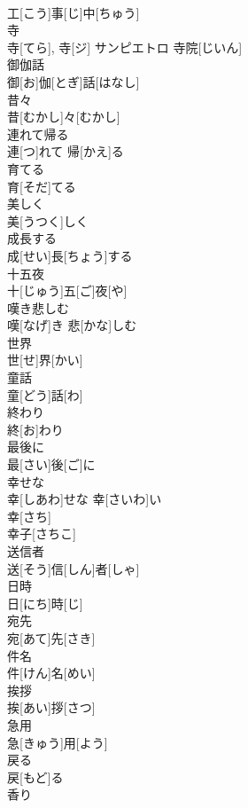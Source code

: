 \documentclass[8pt]{extreport}
\begin{document}
\begin{CJK}{UTF8}{min}
\\	工[こう]事[じ]中[ちゅう]	
\\	寺	
\\	寺[てら], 寺[ジ]	サンピエトロ 寺院[じいん] 
\\	御伽話	
\\	御[お]伽[とぎ]話[はなし]	
\\	昔々	
\\	昔[むかし]々[むかし]	
\\	連れて帰る	
\\	連[つ]れて 帰[かえ]る	
\\	育てる	
\\	育[そだ]てる	
\\	美しく	
\\	美[うつく]しく	
\\	成長する	
\\	成[せい]長[ちょう]する	
\\	十五夜	
\\	十[じゅう]五[ご]夜[や]	
\\	嘆き悲しむ	
\\	嘆[なげ]き 悲[かな]しむ	
\\	世界	
\\	世[せ]界[かい]	
\\	童話	
\\	童[どう]話[わ]	
\\	終わり	
\\	終[お]わり	
\\	最後に	
\\	最[さい]後[ご]に	
\\	幸せな	
\\	幸[しあわ]せな	幸[さいわ]い　
\\	幸[さち] 
\\	幸子[さちこ] 
\\	送信者	
\\	送[そう]信[しん]者[しゃ]	
\\	日時	
\\	日[にち]時[じ]	
\\	宛先	
\\	宛[あて]先[さき]	
\\	件名	
\\	件[けん]名[めい]	
\\	挨拶	
\\	挨[あい]拶[さつ]	
\\	急用	
\\	急[きゅう]用[よう]	
\\	戻る	
\\	戻[もど]る	
\\	香り	

\end{CJK}
\end{document}
